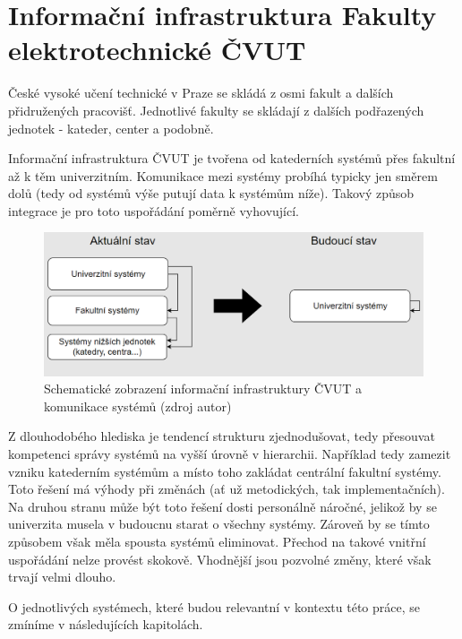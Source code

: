 \section{Informační infrastruktura Fakulty elektrotechnické ČVUT}
České vysoké učení technické v Praze se skládá z osmi fakult a dalších přidružených pracovišť. Jednotlivé fakulty se skládají z dalších podřazených jednotek - kateder, center a podobně.\par
Informační infrastruktura ČVUT je tvořena od katederních systémů přes fakultní až k těm univerzitním. Komunikace mezi systémy probíhá typicky jen směrem dolů (tedy od systémů výše putují data k systémům níže). Takový způsob integrace je pro toto uspořádání poměrně vyhovující.\par
\begin{figure}[htbp!]
	\includegraphics[width=\linewidth]{img/ctu-infrastructure.png}
	\caption{Schematické zobrazení informační infrastruktury ČVUT a komunikace systémů (zdroj autor)}
	\label{fig:ctu-infrastructure}
\end{figure}
Z dlouhodobého hlediska je tendencí strukturu zjednodušovat, tedy přesouvat kompetenci správy systémů na vyšší úrovně v hierarchii. Například tedy zamezit vzniku katederním systémům a místo toho zakládat centrální fakultní systémy. Toto řešení má výhody při změnách (ať už metodických, tak implementačních). Na druhou stranu může být toto řešení dosti personálně náročné, jelikož by se univerzita musela v budoucnu starat o všechny systémy. Zároveň by se tímto způsobem však měla spousta systémů eliminovat. Přechod na takové vnitřní uspořádání nelze provést skokově. Vhodnější jsou pozvolné změny, které však trvají velmi dlouho. \par
\noindent O jednotlivých systémech, které budou relevantní v kontextu této práce, se zmíníme v následujících kapitolách.





